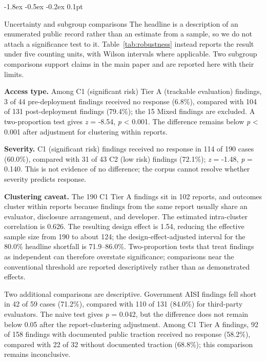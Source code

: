 \documentclass{article}
\makeatletter
\renewcommand{\subsection}{%
  \@startsection{subsection}{2}{\z@}%
                {-1.8ex \@plus -0.5ex \@minus -0.2ex}%
                {0.1pt}%
                {\normalsize\bf\raggedright}%
}
\makeatother
\begin{document}
\subsection{Uncertainty and subgroup comparisons}\label{app:subgroups}
The headline is a description of an enumerated public record rather than an estimate from a sample, so we do not attach a significance test to it. Table~\ref{tab:robustness} instead reports the result under five counting units, with Wilson intervals where applicable. Two subgroup comparisons support claims in the main paper and are reported here with their limits.

\noindent\textbf{Access type.}
Among C1 (significant risk) Tier A (trackable evaluation) findings, 3 of 44 pre-deployment findings received no response (6.8\%), compared with 104 of 131 post-deployment findings (79.4\%); the 15 Mixed findings are excluded. A two-proportion test gives \emph{z} = -8.54, \emph{p} \textless{} 0.001. The difference remains below \emph{p} \textless{} 0.001 after adjustment for clustering within reports.

\noindent\textbf{Severity.}
C1 (significant risk) findings received no response in 114 of 190 cases (60.0\%), compared with 31 of 43 C2 (low risk) findings (72.1\%); \emph{z} = -1.48, \emph{p} = 0.140. This is not evidence of no difference; the corpus cannot resolve whether severity predicts response.

\noindent\textbf{Clustering caveat.}
The 190 C1 Tier A findings sit in 102 reports, and outcomes cluster within reports because findings from the same report usually share an evaluator, disclosure arrangement, and developer. The estimated intra-cluster correlation is 0.626. The resulting design effect is 1.54, reducing the effective sample size from 190 to about 124; the design-effect-adjusted interval for the 80.0\% headline shortfall is 71.9--86.0\%. Two-proportion tests that treat findings as independent can therefore overstate significance; comparisons near the conventional threshold are reported descriptively rather than as demonstrated effects.

Two additional comparisons are descriptive. Government AISI findings fell short in 42 of 59 cases (71.2\%), compared with 110 of 131 (84.0\%) for third-party evaluators. The naive test gives \emph{p} = 0.042, but the difference does not remain below 0.05 after the report-clustering adjustment. Among C1 Tier A findings, 92 of 158 findings with documented public traction received no response (58.2\%), compared with 22 of 32 without documented traction (68.8\%); this comparison remains inconclusive.
\end{document}

